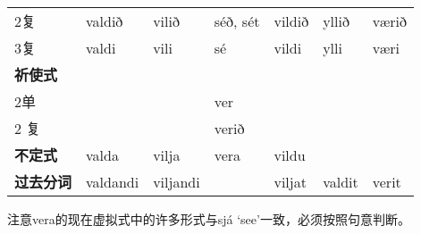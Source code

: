\begin{longtable}{llll|lll}
    2复               & valdið                   & vilið                    & séð, sét              & vildið & yllið              & værið      \\
    3复               & valdi                    & vili                     & sé                    & vildi  & ylli               & væri       \\
    \textbf{祈使式}   &                          &                          & \multicolumn{1}{r}{ } &        &                    &            \\
    2单               &                          &                          & ver                   &        &                    &            \\
    2 复              &                          &                          & verið                 &        &                    &            \\
    \textbf{不定式}   & valda                    & vilja                    & vera                  & vildu  &                    &            \\
    \textbf{过去分词} & valdandi                 & viljandi                 &                       & viljat & valdit             & verit      \\
\end{longtable}

注意vera的现在虚拟式中的许多形式与sjá `see‌'一致，必须按照句意判断。
